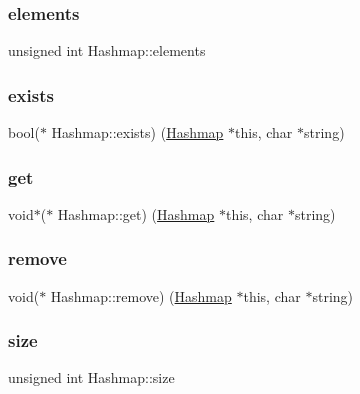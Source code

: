 \subsubsection{\texorpdfstring{elements}{elements}}
{\footnotesize\ttfamily unsigned int Hashmap\+::elements}

\mbox{\label{structHashmap_abcabe76ebc3b3f7744bc78b3d31682dc}} 
\subsubsection{\texorpdfstring{exists}{exists}}
{\footnotesize\ttfamily bool($\ast$  Hashmap\+::exists) (\hyperlink{structHashmap}{Hashmap} $\ast$this, char $\ast$string)}

\mbox{\label{structHashmap_a94750a8d94eb1d30ad153ccc447c40ae}} 
\subsubsection{\texorpdfstring{get}{get}}
{\footnotesize\ttfamily void$\ast$($\ast$  Hashmap\+::get) (\hyperlink{structHashmap}{Hashmap} $\ast$this, char $\ast$string)}

\mbox{\label{structHashmap_a869ddf80d753042c35a4741a0bd5b10b}} 
\subsubsection{\texorpdfstring{remove}{remove}}
{\footnotesize\ttfamily void($\ast$  Hashmap\+::remove) (\hyperlink{structHashmap}{Hashmap} $\ast$this, char $\ast$string)}

\mbox{\label{structHashmap_acb5951c2662ce58e2196fcb465551e36}} 
\subsubsection{\texorpdfstring{size}{size}}
{\footnotesize\ttfamily unsigned int Hashmap\+::size}

\mbox{\label{structHashmap_a84d20ef62c1f397de5fdac234445c1e7}} 
